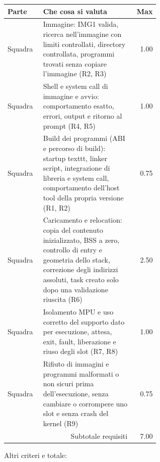 \begin{center}
\small
\begin{tabular}{|l|p{0.6\linewidth}|r|}
\hline
Parte & \raggedright Che cosa si valuta & Max \tabularnewline
\hline\hline
Squadra & \raggedright Immagine: IMG1 valida, ricerca nell'immagine con limiti controllati, directory controllata, programmi trovati senza copiare l'immagine (R2, R3) & 1.00 \tabularnewline
\hline
Squadra & \raggedright Shell e system call di immagine e avvio: comportamento esatto, errori, output e ritorno al prompt (R4, R5) & 1.00 \tabularnewline
\hline
Squadra & \raggedright Build dei programmi (ABI e percorso di build): startup texttt, linker script, integrazione di libreria e system call, comportamento dell'host tool della propria versione (R1, R2) & 0.75 \tabularnewline
\hline
Squadra & \raggedright Caricamento e relocation: copia del contenuto inizializzato, BSS a zero, controllo di entry e geometria dello stack, correzione degli indirizzi assoluti, task creato solo dopo una validazione riuscita (R6) & 2.50 \tabularnewline
\hline
Squadra & \raggedright Isolamento MPU e uso corretto del supporto dato per esecuzione, attesa, exit, fault, liberazione e riuso degli slot (R7, R8) & 1.00 \tabularnewline
\hline
Squadra & \raggedright Rifiuto di immagini e programmi malformati o non sicuri prima dell'esecuzione, senza cambiare o corrompere uno slot e senza crash del kernel (R9) & 0.75 \tabularnewline
\hline
\multicolumn{2}{|r|}{Subtotale requisiti} & 7.00 \tabularnewline
\hline
\end{tabular}
\end{center}

Altri criteri e totale:

